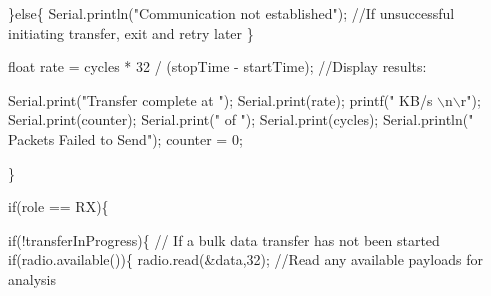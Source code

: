 \begin{DoxyCodeInclude}
   \}\textcolor{keywordflow}{else}\{                                             
       Serial.println(\textcolor{stringliteral}{"Communication not established"});       \textcolor{comment}{//If unsuccessful initiating transfer, exit
       and retry later}
   \} 
    
   \textcolor{keywordtype}{float} rate = cycles * 32 / (stopTime - startTime);         \textcolor{comment}{//Display results:}
    
   Serial.print(\textcolor{stringliteral}{"Transfer complete at "}); Serial.print(rate); printf(\textcolor{stringliteral}{" KB/s \(\backslash\)n\(\backslash\)r"});
   Serial.print(counter);
   Serial.print(\textcolor{stringliteral}{" of "});
   Serial.print(cycles); Serial.println(\textcolor{stringliteral}{" Packets Failed to Send"});
   counter = 0;   
    
   \}
  
  
  
\textcolor{keywordflow}{if}(role == RX)\{  
  
  \textcolor{keywordflow}{if}(!transferInProgress)\{                       \textcolor{comment}{// If a bulk data transfer has not been started}
     \textcolor{keywordflow}{if}(radio.available())\{                      
        radio.read(&data,32);                    \textcolor{comment}{//Read any available payloads for analysis}


\end{DoxyCodeInclude}
